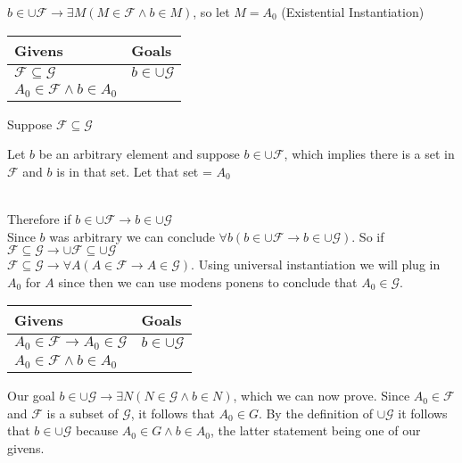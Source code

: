 \documentclass{article}
\newcommand{\n}{ \noindent }
\newcommand{\F}{\mathcal{F}}
\newcommand{\G}{\mathcal{G}}
\begin{document}
\n $b \in \cup \F \rightarrow \exists M (M \in \F \wedge b \in M)$, so let $M = A_{0}$ (Existential Instantiation)


\begin{table}[h]
\begin{tabular}{ll}
\hline
Givens & Goals   \\ \hline
$\F \subseteq \G$ & $b \in \cup \G$   \\
$A_{0} \in \F \wedge b \in A_{0}$ & \\ \hline
\end{tabular}
\end{table}

\n Suppose $\F \subseteq \G$
\begin{addmargin}[0.55cm]{0cm}
\n Let $b$ be an arbitrary element and suppose $b \in \cup \F$, which implies there is a set in $\F$ and $b$ is in that set. Let that set = $A_{0}$
\end{addmargin}

\indent \indent [proof of $b \in \cup \G$ ] \\
\indent Therefore if $b \in \cup \F \rightarrow b \in \cup \G$ \\
\n Since $b$ was arbitrary we can conclude $\forall b (b \in \cup \F \rightarrow b \in \cup \G)$. So if $\F \subseteq \G \rightarrow \cup \F \subseteq \cup \G$ \\

\n $\F \subseteq \G \rightarrow \forall A(A \in \F \rightarrow A \in \G)$. Using universal instantiation we will plug in $A_{0}$ for $A$ since then we can use modens ponens to conclude that $A_{0} \in \G$.

\begin{table}[h]
\begin{tabular}{ll}
\hline
Givens & Goals   \\ \hline
$A_{0} \in \F \rightarrow A_{0} \in \G$ & $b \in \cup \G$  \\
$A_{0} \in \F \wedge b \in A_{0}$ & \\ \hline
\end{tabular}
\end{table}

\n Our goal $b \in \cup \G \rightarrow \exists N (N \in \G \wedge b \in N)$, which we can now prove. Since $A_{0} \in \F$ and $\F$ is a subset of $\G$, it follows that $A_{0} \in G$. By the definition of $\cup \G$ it follows that $b \in \cup \G$ because $A_{0} \in G \wedge b \in A_{0}$, the latter statement being one of our givens. \\
\end{document}
